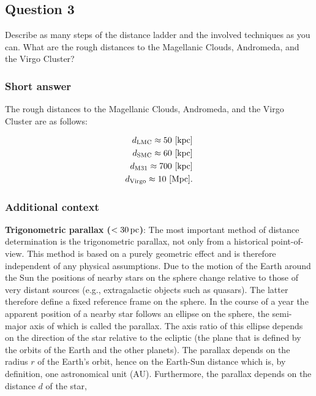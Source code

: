 \documentclass[a4paper,10pt]{article}
\begin{document}
\newpage
\subsection{Question 3}

Describe as many steps of the distance ladder and the involved techniques as you can. What are the rough distances to the Magellanic Clouds, Andromeda, and the Virgo Cluster?

\subsubsection{Short answer}

The rough distances to the Magellanic Clouds, Andromeda, and the Virgo Cluster are as follows:

\begin{align*}
    d_\mathrm{LMC} \approx 50 ~ [{\rm kpc}] \\
    d_\mathrm{SMC} \approx 60 ~ [{\rm kpc}] \\
    d_\mathrm{M31} \approx 700 ~ [{\rm kpc}] \\
    d_\mathrm{Virgo} \approx 10 ~ [{\rm Mpc}].
\end{align*}

\subsubsection{Additional context}

{\noindent}\textbf{Trigonometric parallax ($<30\,{\rm pc}$)}: The most important method of distance determination is the trigonometric parallax, not only from a historical point-of-view. This method is based on a purely geometric effect and is therefore independent of any physical assumptions. Due to the motion of the Earth around the Sun the positions of nearby stars on the sphere change relative to those of very distant sources (e.g., extragalactic objects such as quasars). The latter therefore define a fixed reference frame on the sphere. In the course of a year the apparent position of a nearby star follows an ellipse on the sphere, the semi-major axis of which is called the parallax. The axis ratio of this ellipse depends on the direction of the star relative to the ecliptic (the plane that is defined by the orbits of the Earth and the other planets). The parallax depends on the radius $r$ of the Earth’s orbit, hence on the Earth-Sun distance which is, by definition, one astronomical unit (AU). Furthermore, the parallax depends on the distance $d$ of the star,
\end{document}

